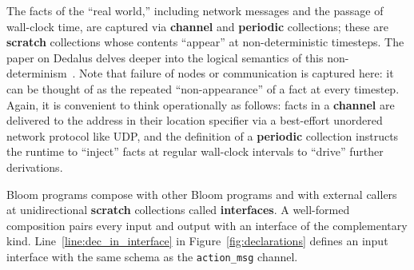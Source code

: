 The facts of the ``real world,'' including network messages and the passage of
wall-clock time, are captured via \textbf{channel} and \textbf{periodic}
collections; these are \textbf{scratch} collections whose contents ``appear''
at non-deterministic timesteps. 
The paper on Dedalus delves deeper into the logical semantics of this
non-determinism~\cite{dedalus}.  Note that failure of nodes or
communication is captured here: it can be thought of as the repeated
``non-appearance'' of a fact at every timestep.  Again, it is convenient to
think operationally as follows: facts in a \textbf{channel} are delivered to
the address in their location specifier via a best-effort unordered network
protocol like UDP, and the definition of a \textbf{periodic} collection
instructs the runtime to ``inject'' facts at regular wall-clock intervals to
``drive'' further derivations.

Bloom programs compose with other Bloom programs and with external callers at unidirectional
\textbf{scratch} collections called \textbf{interfaces}.  A well-formed composition pairs
every input and output with an interface of the complementary kind.  Line~\ref{line:dec_in_interface} in 
Figure~\ref{fig:declarations} defines an input interface with the same schema as the \texttt{action\_msg}
channel.

\begin{comment}
\begin{figure}[t]
\begin{scriptsize}
\begin{verbatim}
 1      class SimplePQueue < Bud
 2      def state
 3        table :q, ['id'], ['payload']
 4        table :min_id, ['id']
 5        table :log, ['id'], ['payload']
 6        scratch :newmins, ['id'], ['payload']
 7        channel :output, 0, ['addr', 'id'], ['payload']
 8      end
 9    
10      declare
11      def dequeue
12        # find min_id value, agg across all items (group=nil)
13        min_id <= q.group(nil, min(q.id))
14    
15        # find the q items with min_id via natural join
16        mins = natjoin [q, min_id] {|q, m| q }
17    
18        # idempotence: ignore items with id previously logged
19        newmins <= mins.map do |q| 
20          q unless log.map{|p| p.id}.include? q.id
21        end
22
23        # in the next timestep, add newmins to log, delete from q
24        log <+ newmins.map{|h| [h.id]}
25        q <- mins.map {|q| q}
26      
27        # ship the min items via the output channel
28        output <+ mins.map{|q| ['192.168.1.1:12345'] + q}
29      end
30    end
\end{verbatim}
\vspace{-10pt}
\caption{Example Bloom code for dequeuing items from a priority queue.}
\label{fig:queue}
\end{scriptsize}
\vspace{-2pt}
\end{figure}

\end{comment}

